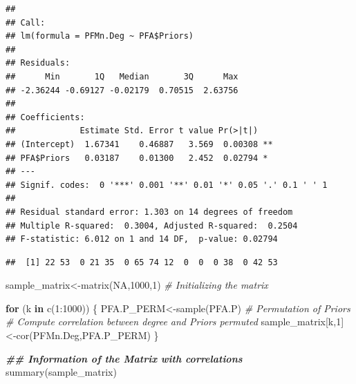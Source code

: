 \documentclass[
  notitlepage,
  onecolumn,
  openany]{book}
\newenvironment{Shaded}{\begin{snugshade}}{\end{snugshade}}
\newcommand{\CommentTok}[1]{\textcolor[rgb]{0.56,0.35,0.01}{\textit{#1}}}
\newcommand{\ConstantTok}[1]{\textcolor[rgb]{0.00,0.00,0.00}{#1}}
\newcommand{\ControlFlowTok}[1]{\textcolor[rgb]{0.13,0.29,0.53}{\textbf{#1}}}
\newcommand{\DecValTok}[1]{\textcolor[rgb]{0.00,0.00,0.81}{#1}}
\newcommand{\DocumentationTok}[1]{\textcolor[rgb]{0.56,0.35,0.01}{\textbf{\textit{#1}}}}
\newcommand{\FunctionTok}[1]{\textcolor[rgb]{0.00,0.00,0.00}{#1}}
\newcommand{\NormalTok}[1]{#1}
\newcommand{\OtherTok}[1]{\textcolor[rgb]{0.56,0.35,0.01}{#1}}
\newcommand{\SpecialCharTok}[1]{\textcolor[rgb]{0.00,0.00,0.00}{#1}}
\begin{document}
\begin{Shaded}
\end{Shaded}

\begin{verbatim}
## 
## Call:
## lm(formula = PFMn.Deg ~ PFA$Priors)
## 
## Residuals:
##      Min       1Q   Median       3Q      Max 
## -2.36244 -0.69127 -0.02179  0.70515  2.63756 
## 
## Coefficients:
##             Estimate Std. Error t value Pr(>|t|)   
## (Intercept)  1.67341    0.46887   3.569  0.00308 **
## PFA$Priors   0.03187    0.01300   2.452  0.02794 * 
## ---
## Signif. codes:  0 '***' 0.001 '**' 0.01 '*' 0.05 '.' 0.1 ' ' 1
## 
## Residual standard error: 1.303 on 14 degrees of freedom
## Multiple R-squared:  0.3004, Adjusted R-squared:  0.2504 
## F-statistic: 6.012 on 1 and 14 DF,  p-value: 0.02794
\end{verbatim}

\begin{Shaded}
\end{Shaded}

\begin{verbatim}
##  [1] 22 53  0 21 35  0 65 74 12  0  0  0 38  0 42 53
\end{verbatim}

\begin{Shaded}
\begin{Highlighting}[]
\NormalTok{sample\_matrix}\OtherTok{\textless{}{-}}\FunctionTok{matrix}\NormalTok{(}\ConstantTok{NA}\NormalTok{,}\DecValTok{1000}\NormalTok{,}\DecValTok{1}\NormalTok{) }\CommentTok{\# Initializing the matrix}

\ControlFlowTok{for}\NormalTok{ (k }\ControlFlowTok{in} \FunctionTok{c}\NormalTok{(}\DecValTok{1}\SpecialCharTok{:}\DecValTok{1000}\NormalTok{))}
\NormalTok{\{}
\NormalTok{  PFA.P\_PERM}\OtherTok{\textless{}{-}}\FunctionTok{sample}\NormalTok{(PFA.P) }\CommentTok{\# Permutation of Priors}
  \CommentTok{\# Compute correlation between degree and Priors permuted}
\NormalTok{  sample\_matrix[k,}\DecValTok{1}\NormalTok{]}\OtherTok{\textless{}{-}}\FunctionTok{cor}\NormalTok{(PFMn.Deg,PFA.P\_PERM) }
\NormalTok{\}}

\DocumentationTok{\#\# Information of the Matrix with correlations}
\FunctionTok{summary}\NormalTok{(sample\_matrix)}
\end{Highlighting}
\end{Shaded}
\end{document}
